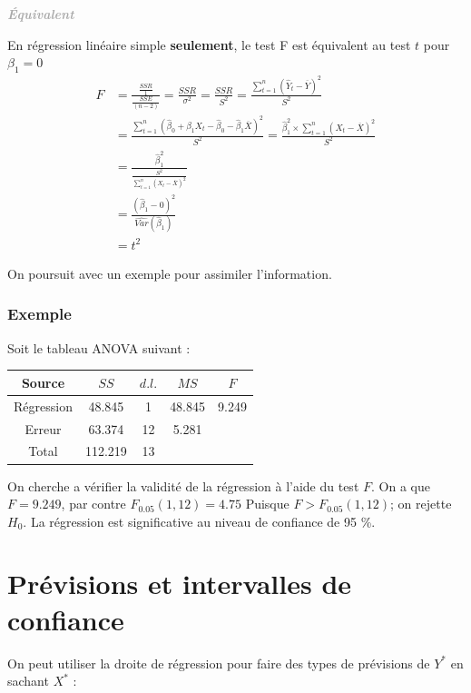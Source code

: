 \documentclass[11pt,french]{report}
\newenvironment{moreInfo}[1]
	{\begin{mdframed}
	\textcolor{darkgray}{\huge \raisebox{-3.5pt}{\faInfo} 
	\hspace{0.5cm} \large\bfseries #1}\\[5pt]
	\normalsize
	\makebox[0.1\textwidth][l]{}	
	\begin{minipage}{10cm}}
	{	\end{minipage}
	\end{mdframed}}
\begin{document}
\begin{moreInfo}{\emph{Équivalent}}
\label{equivalent}
	En régression linéaire simple \textbf{seulement}, le test F est équivalent au test $t$ pour $\beta_1 = 0$
	\begin{align*}
	F &= \frac{\frac{SSR}{1}}{\frac{SSE}{(n-2)}} = \frac{SSR}{\sigma^2} = \frac{SSR}{S^2} = \frac{\sum_{t=1}^n (\hat{Y}_t - \overline{Y})^2}{S^2} \\
	&= \frac{\sum_{t=1}^n(\hat{\beta}_0 + \hat{\beta}_1X_t - \hat{\beta}_0 - \hat{\beta}_1\overline{X})^2}{S^2} = \frac{\hat{\beta}_1^2 \times \sum_{t=1}^n(X_t - \overline{X})^2}{S^2} \\
	&= \frac{\hat{\beta}_1^2}{\frac{S^2}{\sum_{t=1}^n(X_t - \overline{X})^2}} \\
	&= \frac{(\hat{\beta}_1 - 0)^2}{\widehat{Var}(\hat{\beta}_1)} \\
	&= t^2
	\end{align*}
\end{moreInfo}

\bigskip
On poursuit avec un exemple pour assimiler l'information.

\subsubsection*{Exemple}
Soit le tableau ANOVA suivant :
\begin{center}
\begin{tabular}{|c|c|c|c|c|}
\hline
Source & $SS$ & $d.l.$ & $MS$ & $F$ \\
\hline
Régression & 48.845 & 1 & 48.845 & 9.249 \\
Erreur & 63.374 & 12 & 5.281 & \\
\hline
Total & 112.219 & 13 & & \\
\hline
\end{tabular}
\end{center}
On cherche a vérifier la validité de la régression à l'aide du test $F$. \newline
On a que $F = 9.249$, par contre $F_{0.05}(1, 12) = 4.75$ \newline
Puisque $F>F_{0.05}(1, 12)$; on rejette $H_0$. La régression est significative au niveau de confiance de 95 \%.

\section{Prévisions et intervalles de confiance}
On peut utiliser la droite de régression pour faire des types de prévisions de $Y^*$ en sachant $X^*$ :
\end{document}
